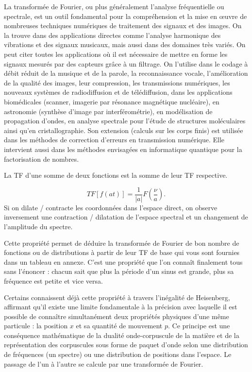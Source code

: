 La transformée de Fourier, ou plus généralement l'analyse fréquentielle ou
spectrale, est un outil fondamental pour la compréhension et la mise en œuvre de
nombreuses techniques numériques de traitement des signaux et des images. On la
trouve dans des applications directes comme l'analyse harmonique des vibrations
et des signaux musicaux, mais aussi dans des domaines très variés. On peut citer
toutes les applications où il est nécessaire de mettre en forme les signaux
mesurés par des capteurs grâce à un filtrage. On l'utilise dans le codage à débit
réduit de la musique et de la parole, la reconnaissance vocale, l'amélioration de
la qualité des images, leur compression, les transmissions numériques, les
nouveaux systèmes de radiodiffusion et de télédiffusion, dans les applications
biomédicales (scanner, imagerie par résonance magnétique nucléaire), en
astronomie (synthèse d'image par interférométrie), en modélisation de
propagation d'ondes, en analyse spectrale pour l'étude de structures
moléculaires ainsi qu'en cristallographie. Son extension (calculs sur les corps
finis) est utilisée dans les méthodes de correction d'erreurs en transmission
numérique. Elle intervient aussi dans les méthodes envisagées en informatique
quantique pour la factorisation de nombres.

\begin{prop}
  La TF d'une somme de deux fonctions est la somme de leur TF respective.
\end{prop}

\begin{prop}
  \[
    TF[f(at)]=\frac{1}{|a|}F\!\left(\frac{\nu}{a}\right).
  \]
  Si on dilate / contracte les coordonnées dans l'espace direct, on observe
  inversement une contraction / dilatation de l'espace spectral et un
  changement de l'amplitude du spectre.
\end{prop}

Cette propriété permet de déduire la transformée de Fourier de bon nombre de
fonctions ou de distributions à partir de leur TF de base qui vous sont fournies
dans un tableau en annexe. C'est une propriété que l'on connaît finalement tous
sans l'énoncer : chacun sait que plus la période d'un sinus est grande, plus sa
fréquence est petite et vice versa.

\begin{remark}
  Certains connaissent déjà cette propriété à travers l'inégalité de Heisenberg,
  affirmant qu'il existe une limite fondamentale à la précision avec laquelle il
  est possible de connaître simultanément deux propriétés physiques d'une même
  particule : la position $x$ et sa quantité de mouvement $p$. Ce principe est
  une conséquence mathématique de la dualité onde-corpuscule de la matière et de
  la représentation des corpuscules sous forme de paquet d'onde selon une
  distribution de fréquences (un spectre) ou une distribution de positions dans
  l'espace. Le passage de l'un à l'autre se calcule par une transformée de
  Fourier.
\end{remark}


